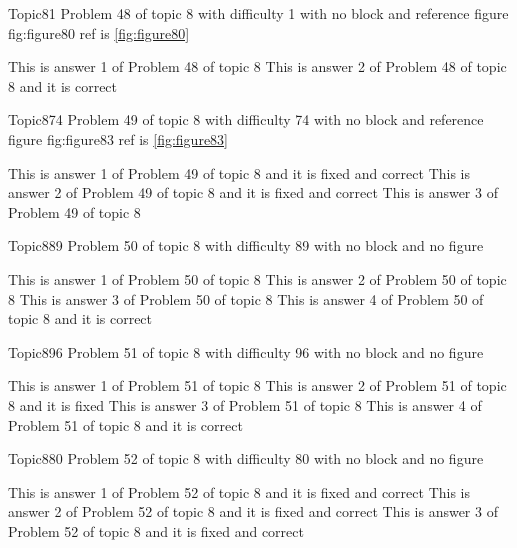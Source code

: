 \documentclass[master]{exam}
\begin{document}
\begin{problem}{Topic8}{1}
	Problem 48 of topic 8 with difficulty 1 with no block and reference figure fig:figure80 ref is \ref{fig:figure80}
	\begin{answers}
		\answer This is answer 1 of Problem 48 of topic 8 
		\answer[correct] This is answer 2 of Problem 48 of topic 8 and it is correct
	\end{answers}
\end{problem}

\begin{problem}{Topic8}{74}
	Problem 49 of topic 8 with difficulty 74 with no block and reference figure fig:figure83 ref is \ref{fig:figure83}
	\begin{answers}
		 This is answer 1 of Problem 49 of topic 8 and it is fixed and correct
		 This is answer 2 of Problem 49 of topic 8 and it is fixed and correct
		\answer This is answer 3 of Problem 49 of topic 8 
	\end{answers}
\end{problem}

\begin{problem}{Topic8}{89}
	Problem 50 of topic 8 with difficulty 89 with no block and no figure
	\begin{answers}
		\answer This is answer 1 of Problem 50 of topic 8 
		\answer This is answer 2 of Problem 50 of topic 8 
		\answer This is answer 3 of Problem 50 of topic 8 
		\answer[correct] This is answer 4 of Problem 50 of topic 8 and it is correct
	\end{answers}
\end{problem}

\begin{problem}{Topic8}{96}
	Problem 51 of topic 8 with difficulty 96 with no block and no figure
	\begin{answers}
		\answer This is answer 1 of Problem 51 of topic 8 
		\answer[fixed] This is answer 2 of Problem 51 of topic 8 and it is fixed
		\answer This is answer 3 of Problem 51 of topic 8 
		\answer[correct] This is answer 4 of Problem 51 of topic 8 and it is correct
	\end{answers}
\end{problem}

\begin{problem}{Topic8}{80}
	Problem 52 of topic 8 with difficulty 80 with no block and no figure
	\begin{answers}
		 This is answer 1 of Problem 52 of topic 8 and it is fixed and correct
		 This is answer 2 of Problem 52 of topic 8 and it is fixed and correct
		 This is answer 3 of Problem 52 of topic 8 and it is fixed and correct
	\end{answers}
\end{problem}
\end{document}

